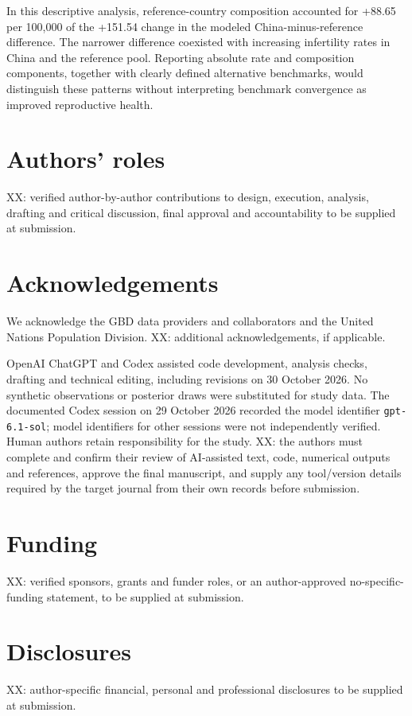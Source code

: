 \documentclass[11pt,a4paper]{article}
\begin{document}
In this descriptive analysis, reference-country composition accounted for +88.65 per 100,000 of the +151.54 change in the modeled China-minus-reference difference. The narrower difference coexisted with increasing infertility rates in China and the reference pool. Reporting absolute rate and composition components, together with clearly defined alternative benchmarks, would distinguish these patterns without interpreting benchmark convergence as improved reproductive health.

\section*{Authors' roles}
XX: verified author-by-author contributions to design, execution, analysis, drafting and critical discussion, final approval and accountability to be supplied at submission.

\section*{Acknowledgements}
We acknowledge the GBD data providers and collaborators and the United Nations Population Division. XX: additional acknowledgements, if applicable.

OpenAI ChatGPT and Codex assisted code development, analysis checks, drafting and technical editing, including revisions on 30 October 2026. No synthetic observations or posterior draws were substituted for study data. The documented Codex session on 29 October 2026 recorded the model identifier \texttt{gpt-6.1-sol}; model identifiers for other sessions were not independently verified. Human authors retain responsibility for the study. XX: the authors must complete and confirm their review of AI-assisted text, code, numerical outputs and references, approve the final manuscript, and supply any tool/version details required by the target journal from their own records before submission.

\section*{Funding}
XX: verified sponsors, grants and funder roles, or an author-approved no-specific-funding statement, to be supplied at submission.

\section*{Disclosures}
XX: author-specific financial, personal and professional disclosures to be supplied at submission.
\end{document}
